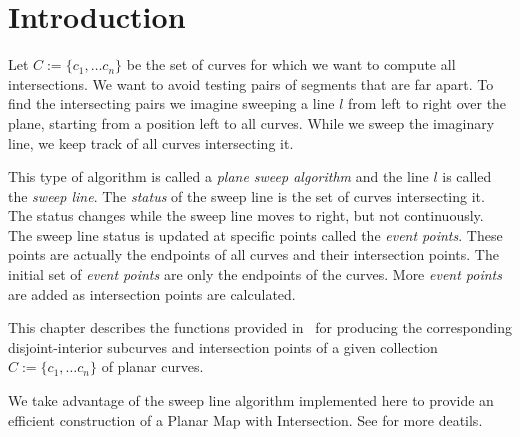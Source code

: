 \section{Introduction}

Let $C:=\{c_1, \ldots c_n\}$ be the set of curves for which we want 
to compute all intersections. We want to avoid testing pairs of segments 
that are far apart. To find the intersecting pairs we imagine sweeping  
a line $l$ from left to right over the plane, starting from a position 
left to all curves. While we sweep the imaginary line, we keep track of all 
curves intersecting it.

This type of algorithm is called a {\em plane sweep algorithm} and the line 
$l$ is called the {\em sweep line}. The {\em status} of the sweep line is 
the set of curves intersecting it. The status changes while the sweep line 
moves to right, but not continuously. The sweep line status is updated at 
specific points called the {\em event points}. These points are actually
the endpoints of all curves and their intersection points. The initial set of 
{\em event points} are only the endpoints of the curves. More {\em event points}
are added as intersection points are calculated.


This chapter describes the functions provided in
\cgal\ for producing the corresponding disjoint-interior 
subcurves and intersection points of a given collection 
$C:=\{c_1, \ldots c_n\}$ of planar curves.

We take advantage of the sweep line algorithm implemented here to provide
an efficient construction of a Planar Map with Intersection. See 
 for more deatils.
